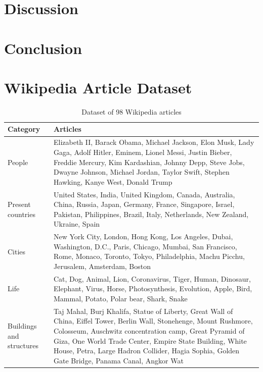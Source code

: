 \documentclass[12pt,oneside]{memoir}
\begin{document}
\chapter{Discussion}

\chapter{Conclusion}

\printbibliography[title={References}]

\clearpage
\appendix
\renewcommand{\chaptername}{Appendix}

\chapter{Wikipedia Article Dataset}

\begin{table}[ht]
    \centering
    \begin{tabular}{p{1in}p{3.8in}}
        \toprule
        \textbf{Category} & \textbf{Articles} \\
        \midrule
        People & Elizabeth II, Barack Obama, Michael Jackson, Elon Musk, Lady Gaga, Adolf Hitler, Eminem, Lionel Messi, Justin Bieber, Freddie Mercury, Kim Kardashian, Johnny Depp, Steve Jobs, Dwayne Johnson, Michael Jordan, Taylor Swift, Stephen Hawking, Kanye West, Donald Trump\\
        \midrule
        Present countries & United States, India, United Kingdom, Canada, Australia, China, Russia, Japan, Germany, France, Singapore, Israel, Pakistan, Philippines, Brazil, Italy, Netherlands, New Zealand, Ukraine, Spain\\
        \midrule
        Cities & New York City, London, Hong Kong, Los Angeles, Dubai, Washington, D.C., Paris, Chicago, Mumbai, San Francisco, Rome, Monaco, Toronto, Tokyo, Philadelphia, Machu Picchu, Jerusalem, Amsterdam, Boston\\
        \midrule
        Life & Cat, Dog, Animal, Lion, Coronavirus, Tiger, Human, Dinosaur, Elephant, Virus, Horse, Photosynthesis, Evolution, Apple, Bird, Mammal, Potato, Polar bear, Shark, Snake\\
        \midrule
        Buildings and structures & Taj Mahal, Burj Khalifa, Statue of Liberty, Great Wall of China, Eiffel Tower, Berlin Wall, Stonehenge, Mount Rushmore, Colosseum, Auschwitz concentration camp, Great Pyramid of Giza, One World Trade Center, Empire State Building, White House, Petra, Large Hadron Collider, Hagia Sophia, Golden Gate Bridge, Panama Canal, Angkor Wat\\
        \bottomrule
    \end{tabular}
    \caption{Dataset of 98 Wikipedia articles}
    \label{table:dataset}
\end{table}
\end{document}
